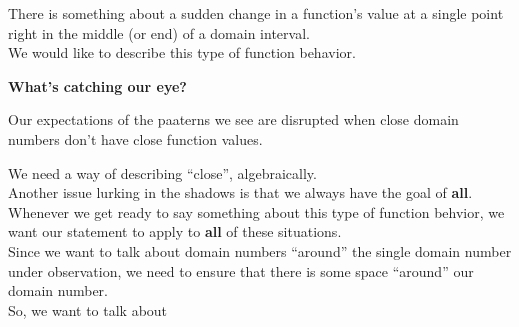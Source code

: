 \documentclass{ximera}
\begin{document}
\begin{image}
\end{image}





There is something about a sudden change in a function's value at a single point right in the middle (or end) of a domain interval.\\

We would like to describe this type of function behavior. \\



\begin{idea}  \textbf{\textcolor{purple!85!blue}{What's catching our eye?}}


Our expectations of the paaterns we see are disrupted when close domain numbers don't have close function values.


\end{idea}



We need a way of describing ``close'', algebraically.  \\


Another issue lurking in the shadows is that we always have the goal of \textbf{\textcolor{red!80!black}{all}}. Whenever we get ready to say something about this type of function behvior, we want our statement to apply to \textbf{\textcolor{red!80!black}{all}} of these situations. \\

Since we want to talk about domain numbers ``around'' the single domain number under observation, we need to ensure that there is some space ``around'' our domain number. \\

So, we want to talk about 
\end{document}
